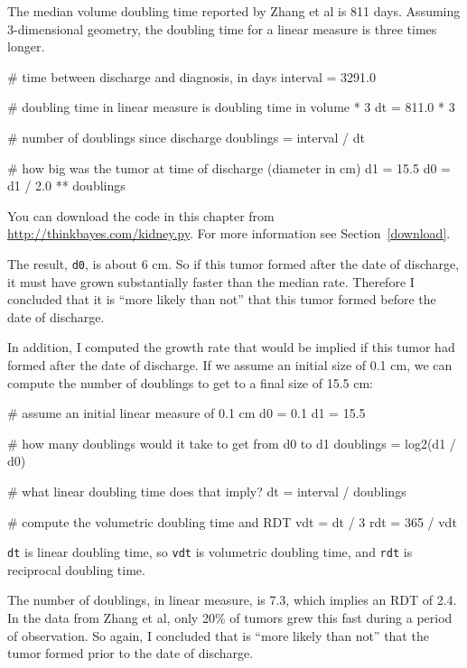 \documentclass[12pt]{book}
\theoremstyle{exercise}
\begin{document}
The median volume doubling time reported by Zhang et al is 811 days.
Assuming 3-dimensional geometry, the doubling time for a linear
measure is three times longer.

\begin{code}
    # time between discharge and diagnosis, in days 
    interval = 3291.0

    # doubling time in linear measure is doubling time in volume * 3
    dt = 811.0 * 3

    # number of doublings since discharge
    doublings = interval / dt

    # how big was the tumor at time of discharge (diameter in cm)
    d1 = 15.5
    d0 = d1 / 2.0 ** doublings
\end{code}

You can download the code in this chapter from
\url{http://thinkbayes.com/kidney.py}.  For more information
see Section~\ref{download}.

The result, {\tt d0}, is about 6 cm.  So if this tumor formed after
the date of discharge, it must have grown substantially faster than
the median rate.  Therefore I concluded that it is ``more likely than
not'' that this tumor formed before the date of discharge.

In addition, I computed the growth rate that would be implied
if this tumor had formed after the date of discharge.  If we
assume an initial size of 0.1 cm, we can compute the number of
doublings to get to a final size of 15.5 cm:

\begin{code}
    # assume an initial linear measure of 0.1 cm
    d0 = 0.1
    d1 = 15.5

    # how many doublings would it take to get from d0 to d1
    doublings = log2(d1 / d0)

    # what linear doubling time does that imply?
    dt = interval / doublings

    # compute the volumetric doubling time and RDT
    vdt = dt / 3
    rdt = 365 / vdt
\end{code}

{\tt dt} is linear doubling time, so {\tt vdt} is volumetric
doubling time, and {\tt rdt} is reciprocal doubling
time.

The number of doublings, in linear measure, is 7.3, which implies
an RDT of 2.4.  In the data from Zhang et al, only 20\% of tumors
grew this fast during a period of observation.  So again,
I concluded that is ``more likely than not'' that the tumor
formed prior to the date of discharge.
\end{document}
